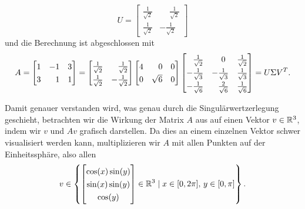\begin{example}
\begin{equation*}
        U =
        \begin{bmatrix}
            \frac{1}{\sqrt{2}} & \phantom{-}\frac{1}{\sqrt{2}} \\
            \frac{1}{\sqrt{2}} & -\frac{1}{\sqrt{2}}
        \end{bmatrix}
    \end{equation*}
    und die Berechnung ist abgeschlossen mit
    \begin{equation*}
        A =
        \begin{bmatrix}
            1 & -1 & 3 \\
            3 & \phantom{-}1 & 1
        \end{bmatrix}
        =
        \begingroup
        \renewcommand{\arraystretch}{1.3}
        \begin{bmatrix}
            \frac{1}{\sqrt{2}} & \phantom{-}\frac{1}{\sqrt{2}} \\
            \frac{1}{\sqrt{2}} & -\frac{1}{\sqrt{2}}
        \end{bmatrix}
        \endgroup
        \begin{bmatrix}
            4 & \phantom{\surd}0 & 0 \\
            0 & \sqrt{6} & 0
        \end{bmatrix}
        \begingroup
        \renewcommand{\arraystretch}{1.3}
        \begin{bmatrix}
            \phantom{-}\frac{1}{\sqrt{2}} & \phantom{-}0 & \frac{1}{\sqrt{2}} \\
            -\frac{1}{\sqrt{3}} & -\frac{1}{\sqrt{3}} & \frac{1}{\sqrt{3}} \\
            -\frac{1}{\sqrt{6}} & \phantom{-}\frac{2}{\sqrt{6}} & \frac{1}{\sqrt{6}} \\
        \end{bmatrix}
        \endgroup
        =
        U \Sigma V^{T}.
    \end{equation*}
\end{example}
Damit genauer verstanden wird, was genau durch die Singulärwertzerlegung geschieht, betrachten wir die Wirkung der Matrix \(A\) aus  auf einen Vektor \(v \in \mathbb{R}^{3}\), indem wir \(v\) und \(Av\) grafisch darstellen.  
Da dies an einem einzelnen Vektor schwer visualisiert werden kann, multiplizieren wir \(A\) mit allen Punkten auf der Einheitssphäre, also allen 
\begin{equation*}
    v \in 
    \left\{
    \begin{bmatrix}
        \cos(x)\sin(y) \\ \sin(x)\sin(y) \\ \cos(y)
    \end{bmatrix}
    \in \R^{3}
    \mid
    x \in [0, 2\pi], \, y \in [0, \pi]
    \right\}.
\end{equation*} 
